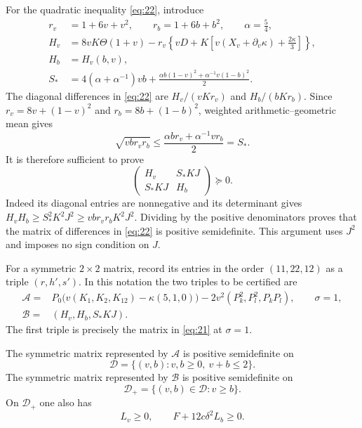 For the quadratic inequality \eqref{eq:22}, introduce
\[
\begin{aligned}
 r_v&=1+6v+v^2,\qquad r_b=1+6b+b^2,
       \qquad \alpha=\frac54,\\
 H_v&=8vK\Theta(1+v)
       -r_v\left\{vD+K\left[v(X_v+\partial_v\kappa)
                                      +\frac{2\kappa}{3}\right]\right\},\\
 H_b&=H_v(b,v),\\
 S_*&=4(\alpha+\alpha^{-1})vb
       +\frac{\alpha b(1-v)^2+\alpha^{-1}v(1-b)^2}{2}.
\end{aligned}
\]
The diagonal differences in \eqref{eq:22} are
$H_v/(vKr_v)$ and $H_b/(bKr_b)$. Since
$r_v=8v+(1-v)^2$ and $r_b=8b+(1-b)^2$, weighted arithmetic--geometric
mean gives
\[
 \sqrt{vb r_vr_b}
       \le\frac{\alpha b r_v+\alpha^{-1}v r_b}{2}=S_*.
\]
It is therefore sufficient to prove
\[
 \begin{pmatrix}H_v&S_*KJ\\S_*KJ&H_b\end{pmatrix}\succeq0.
\]
Indeed its diagonal entries are nonnegative and its determinant gives
$H_vH_b\ge S_*^2K^2J^2\ge vb r_vr_bK^2J^2$. Dividing by the positive
denominators proves that the matrix of differences in \eqref{eq:22}
is positive semidefinite. This argument uses $J^2$ and imposes no sign
condition on $J$.

For a symmetric $2\times2$ matrix, record its entries in the order
$(11,22,12)$ as a triple $(r,h',s')$. In this notation the two triples
to be certified are
\[
\begin{aligned}
 \mathcal A={}&P_0\bigl(v(K_1,K_2,K_{12})-\kappa(5,1,0)\bigr)
       -2v^2(P_k^2,P_l^2,P_kP_l),\qquad \sigma=1,\\
 \mathcal B={}&(H_v,H_b,S_*KJ).
\end{aligned}
\]
The first triple is precisely the matrix in \eqref{eq:21} at
$\sigma=1$.

\begin{lemma}
\label{lem:matrix-certificates}
The symmetric matrix represented by $\mathcal A$ is positive semidefinite on
\[
 \mathcal D=\{(v,b):v,b\ge0,\ v+b\le2\}.
\]
The symmetric matrix represented by $\mathcal B$ is positive semidefinite on
\[
 \mathcal D_+=\{(v,b)\in\mathcal D:v\ge b\}.
\]
On $\mathcal D_+$ one also has
\[
 L_v\ge0,\qquad F+12c\delta^2L_b\ge0.
\]
\end{lemma}

